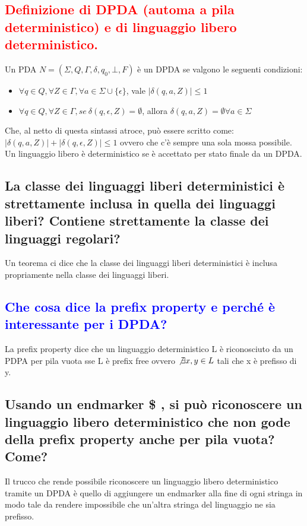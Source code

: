 \documentclass{article}
\begin{document}
\subsection{\textcolor{red}{Definizione di DPDA (automa a pila deterministico) e di linguaggio libero deterministico.}}
Un PDA $N=(\Sigma,Q,\Gamma,\delta,q_0,\bot,F)$ è un DPDA se valgono le seguenti condizioni:
\begin{itemize}
    \item $\forall q \in Q, \forall Z \in \Gamma,\forall a\in\Sigma\cup\{\epsilon\}$, vale $|\delta(q,a,Z)|\leq 1$
    \item $\forall q   \in Q, \forall Z\in\Gamma, se \ \delta(q,\epsilon,Z) = \emptyset$, allora $\delta(q,a,Z) = \emptyset \forall a\in\Sigma$
\end{itemize}
Che, al netto di questa sintassi atroce, può essere scritto come: $|\delta(q,a,Z)|+|\delta(q,\epsilon,Z)| \leq 1$ ovvero che c'è sempre una sola mossa possibile.
Un linguaggio libero è deterministico se è accettato per stato finale da un DPDA.
\subsection{La classe dei linguaggi liberi deterministici è strettamente inclusa in quella dei linguaggi liberi? Contiene strettamente la classe dei linguaggi regolari?}
Un teorema ci dice che la classe dei linguaggi liberi deterministici è inclusa
propriamente nella classe dei linguaggi liberi.

\subsection{\textcolor{blue}{Che cosa dice la prefix property e perché è interessante per i DPDA?}}
La prefix property dice che un linguaggio deterministico L è riconosciuto da un PDPA per pila vuota sse L è prefix free ovvero $\not\exists x,y \in L$ tali che x è prefisso di y.

\subsection{Usando un endmarker \$ , si può riconoscere un linguaggio libero deterministico che non gode della prefix property anche per pila vuota? Come?}
Il trucco che rende possibile riconoscere un linguaggio libero deterministico
tramite un DPDA è quello di aggiungere un endmarker alla fine di ogni stringa
in modo tale da rendere impossibile che un'altra stringa del linguaggio ne sia
prefisso.
\end{document}
